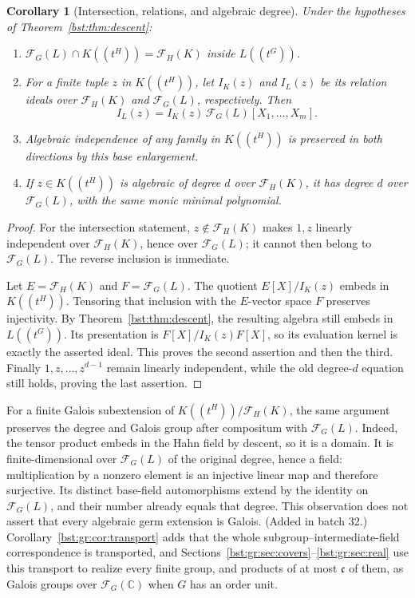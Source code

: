 \documentclass[11pt,letterpaper]{article}
\newtheorem{corollary}[theorem]{Corollary}
\theoremstyle{definition}
\theoremstyle{remark}
\newcommand{\C}{\mathbb C}
\newcommand{\HH}[2]{#1((t^{#2}))}
\newcommand{\FF}[2]{\mathcal F_{#2}(#1)}
\newcommand{\cc}{\mathfrak c}
\begin{document}
\begin{corollary}[Intersection, relations, and algebraic degree]\label{bst:cor:relations}
Under the hypotheses of Theorem~\ref{bst:thm:descent}:
\begin{enumerate}
\item $\FF LG\cap\HH KH=\FF KH$ inside $\HH LG$.
\item For a finite tuple $z$ in $\HH KH$, let $I_K(z)$ and $I_L(z)$ be its
relation ideals over $\FF KH$ and $\FF LG$, respectively. Then
\[
 I_L(z)=I_K(z)\,\FF LG[X_1,\ldots,X_m].
\]
\item Algebraic independence of any family in $\HH KH$ is preserved in both
directions by this base enlargement.
\item If $z\in\HH KH$ is algebraic of degree $d$ over $\FF KH$, it has degree
$d$ over $\FF LG$, with the same monic minimal polynomial.
\end{enumerate}
\end{corollary}
\begin{proof}
For the intersection statement, $z\notin\FF KH$ makes $1,z$ linearly
independent over $\FF KH$, hence over $\FF LG$; it cannot then belong to
$\FF LG$. The reverse inclusion is immediate.

Let $E=\FF KH$ and $F=\FF LG$. The quotient $E[X]/I_K(z)$ embeds in
$\HH KH$. Tensoring that inclusion with the $E$-vector space $F$ preserves
injectivity. By Theorem~\ref{bst:thm:descent}, the resulting algebra still embeds
in $\HH LG$. Its presentation is $F[X]/I_K(z)F[X]$, so its evaluation
kernel is exactly the asserted ideal. This proves the second assertion and
then the third. Finally $1,z,\ldots,z^{d-1}$ remain linearly independent,
while the old degree-$d$ equation still holds, proving the last assertion.
\end{proof}

For a finite Galois subextension of $\HH KH/\FF KH$, the same argument
preserves the degree and Galois group after compositum with $\FF LG$.
Indeed, the tensor product embeds in the Hahn field by descent, so it
is a domain. It is finite-dimensional over $\FF LG$ of the original
degree, hence a field: multiplication by a nonzero element is an injective
linear map and therefore surjective. Its distinct
base-field automorphisms extend by the identity on $\FF LG$, and their
number already equals that degree. This observation does not assert that
every algebraic germ extension is Galois.
(Added in batch 32.) Corollary~\ref{bst:gr:cor:transport} adds that the whole
subgroup--intermediate-field correspondence is transported, and
Sections~\ref{bst:gr:sec:covers}--\ref{bst:gr:sec:real} use this transport to
realize every finite group, and products of at most $\cc$ of them, as Galois
groups over $\FF{\C}G$ when $G$ has an order unit.
\end{document}
